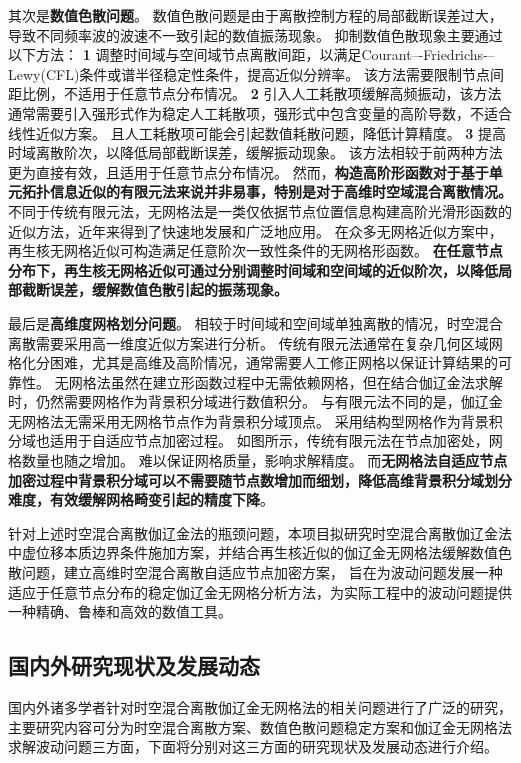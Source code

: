其次是\textbf{数值色散问题}。
数值色散问题是由于离散控制方程的局部截断误差过大，导致不同频率波的波速不一致引起的数值振荡现象。
抑制数值色散现象主要通过以下方法：
\textcircled{\textbf{\small 1}}
调整时间域与空间域节点离散间距，以满足Courant–-Friedrichs-–Lewy(CFL)条件或谱半径稳定性条件，提高近似分辨率。
该方法需要限制节点间距比例，不适用于任意节点分布情况。
\textcircled{\textbf{\small 2}}
引入人工耗散项缓解高频振动，该方法通常需要引入强形式作为稳定人工耗散项，强形式中包含变量的高阶导数，不适合线性近似方案。
且人工耗散项可能会引起数值耗散问题，降低计算精度。
\textcircled{\textbf{\small 3}}
提高时域离散阶次，以降低局部截断误差，缓解振动现象。
该方法相较于前两种方法更为直接有效，且适用于任意节点分布情况。
然而，\textbf{构造高阶形函数对于基于单元拓扑信息近似的有限元法来说并非易事，特别是对于高维时空域混合离散情况。}
不同于传统有限元法，无网格法\cite{Zhang2004a}是一类仅依据节点位置信息构建高阶光滑形函数的近似方法，近年来得到了快速地发展和广泛地应用。
在众多无网格近似方案中，再生核无网格近似可构造满足任意阶次一致性条件的无网格形函数。
\textbf{在任意节点分布下，再生核无网格近似可通过分别调整时间域和空间域的近似阶次，以降低局部截断误差，缓解数值色散引起的振荡现象。}

最后是\textbf{高维度网格划分问题}。
相较于时间域和空间域单独离散的情况，时空混合离散需要采用高一维度近似方案进行分析。
传统有限元法通常在复杂几何区域网格化分困难，尤其是高维及高阶情况，通常需要人工修正网格以保证计算结果的可靠性。
无网格法虽然在建立形函数过程中无需依赖网格，但在结合伽辽金法求解时，仍然需要网格作为背景积分域进行数值积分。
与有限元法不同的是，伽辽金无网格法无需采用无网格节点作为背景积分域顶点。
采用结构型网格作为背景积分域也适用于自适应节点加密过程。
如图所示，传统有限元法在节点加密处，网格数量也随之增加。
难以保证网格质量，影响求解精度。
而\textbf{无网格法自适应节点加密过程中背景积分域可以不需要随节点数增加而细划，降低高维背景积分域划分难度，有效缓解网格畸变引起的精度下降}。

针对上述时空混合离散伽辽金法的瓶颈问题，本项目拟研究时空混合离散伽辽金法中虚位移本质边界条件施加方案，并结合再生核近似的伽辽金无网格法缓解数值色散问题，建立高维时空混合离散自适应节点加密方案，
旨在为波动问题发展一种适应于任意节点分布的稳定伽辽金无网格分析方法，为实际工程中的波动问题提供一种精确、鲁棒和高效的数值工具。

\subsection{国内外研究现状及发展动态}

国内外诸多学者针对时空混合离散伽辽金无网格法的相关问题进行了广泛的研究，主要研究内容可分为时空混合离散方案、数值色散问题稳定方案和伽辽金无网格法求解波动问题三方面，下面将分别对这三方面的研究现状及发展动态进行介绍。

